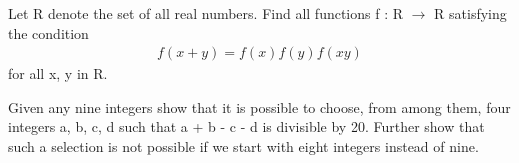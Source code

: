 \item Let R denote the set of all real numbers. Find all functions f : R $\to$ R satisfying the condition
\begin{align*}
f(x + y) = f(x)f(y)f(xy)
\end{align*}
for all x, y in R.

\item Given any nine integers show that it is possible to choose, from among them, four
integers a, b, c, d such that a + b - c - d is divisible by 20. Further show that such a
selection is not possible if we start with eight integers instead of nine.





